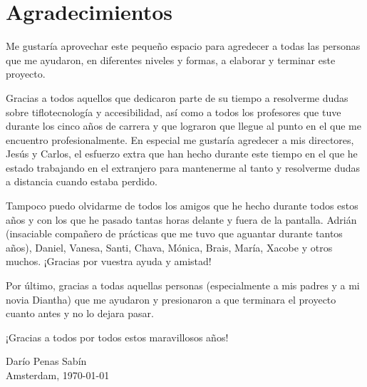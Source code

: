 %
%

\section*{Agradecimientos}

Me gustaría aprovechar este pequeño espacio para agredecer a todas las personas que me ayudaron, en diferentes niveles y formas, a elaborar y terminar este proyecto.

Gracias a todos aquellos que dedicaron parte de su tiempo a resolverme dudas sobre tiflotecnología y accesibilidad, así como a todos los profesores que tuve durante los cinco años de carrera y que lograron que llegue al punto en el que me encuentro profesionalmente. En especial me gustaría agredecer a mis directores, Jesús y Carlos, el esfuerzo extra que han hecho durante este tiempo en el que he estado trabajando en el extranjero para mantenerme al tanto y resolverme dudas a distancia cuando estaba perdido.

Tampoco puedo olvidarme de todos los amigos que he hecho durante todos estos años y con los que he pasado tantas horas delante y fuera de la pantalla. Adrián (insaciable compañero de prácticas que me tuvo que aguantar durante tantos años), Daniel, Vanesa, Santi, Chava, Mónica, Brais, María, Xacobe y otros muchos. ¡Gracias por vuestra ayuda y amistad!

Por último, gracias a todas aquellas personas (especialmente a mis padres y a mi novia Diantha) que me ayudaron y presionaron a que terminara el proyecto cuanto antes y no lo dejara pasar.

¡Gracias a todos por todos estos maravillosos años!

\begin{flushright}
  Darío Penas Sabín \\
  Amsterdam, \today
\end{flushright}

